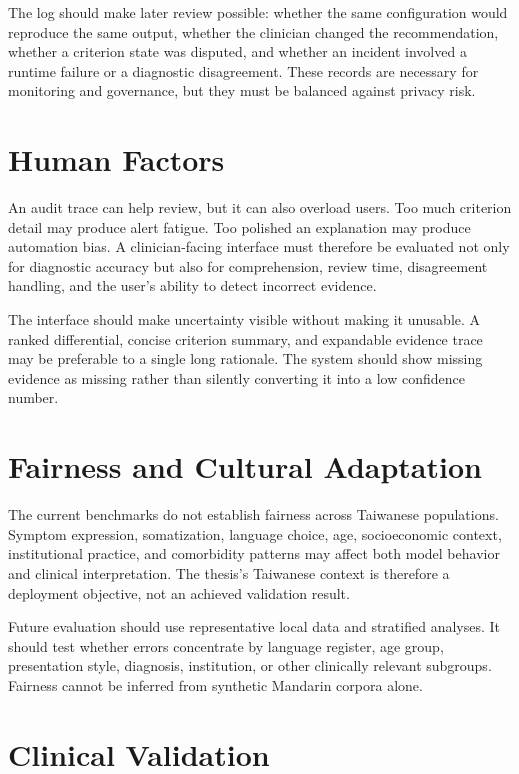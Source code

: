 The log should make later review possible: whether the same configuration would reproduce the same output, whether the clinician changed the recommendation, whether a criterion state was disputed, and whether an incident involved a runtime failure or a diagnostic disagreement. These records are necessary for monitoring and governance, but they must be balanced against privacy risk.

\section{Human Factors}

An audit trace can help review, but it can also overload users. Too much criterion detail may produce alert fatigue. Too polished an explanation may produce automation bias. A clinician-facing interface must therefore be evaluated not only for diagnostic accuracy but also for comprehension, review time, disagreement handling, and the user's ability to detect incorrect evidence.

The interface should make uncertainty visible without making it unusable. A ranked differential, concise criterion summary, and expandable evidence trace may be preferable to a single long rationale. The system should show missing evidence as missing rather than silently converting it into a low confidence number.

\section{Fairness and Cultural Adaptation}

The current benchmarks do not establish fairness across Taiwanese populations. Symptom expression, somatization, language choice, age, socioeconomic context, institutional practice, and comorbidity patterns may affect both model behavior and clinical interpretation. The thesis's Taiwanese context is therefore a deployment objective, not an achieved validation result.

Future evaluation should use representative local data and stratified analyses. It should test whether errors concentrate by language register, age group, presentation style, diagnosis, institution, or other clinically relevant subgroups. Fairness cannot be inferred from synthetic Mandarin corpora alone.

\section{Clinical Validation}

